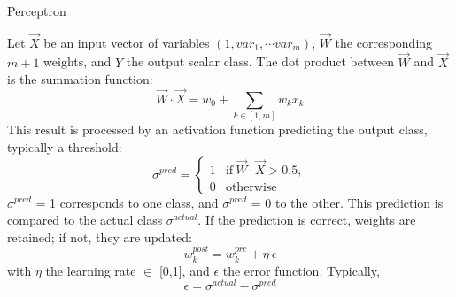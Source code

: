 \begin{algorithm}
      \caption{Perceptron}\label{alg:perceptron}
      Let \( \overrightarrow{X} \) be an input vector of variables \( (1, var_1, \cdots var_m) \), \( \overrightarrow{W} \) the corresponding \(m+1\) weights, and \( Y \) the output scalar class. The dot product between \( \overrightarrow{W} \) and \( \overrightarrow{X} \) is the summation function: 
      \begin{equation}
            \overrightarrow{W} \cdot \overrightarrow{X} = w_0 + \sum_{k \in [1,m]} w_k x_k
      \end{equation}
      This result is processed by an activation function predicting the output class, typically a threshold: 
      \begin{equation}
            \sigma^{pred} = 
            \begin{cases}
            1 & \text{if} \ \overrightarrow{W} \cdot \overrightarrow{X} > 0.5,\\
            0 & \text{otherwise}
            \end{cases}
      \end{equation}
      $\sigma^{pred}$ = 1 corresponds to one class, and $\sigma^{pred}$ = 0 to the other. This prediction is compared to the actual class $\sigma^{actual}$. If the prediction is correct, weights are retained; if not, they are updated: 
      \begin{equation}
            w_k^{post} = w_k^{pre} + \eta \ \epsilon
      \end{equation}
      with $\eta$ the learning rate $\in$ [0,1], and $\epsilon$ the error function. Typically, 
      \begin{equation}
            \epsilon = \sigma^{actual} - \sigma^{pred}
      \end{equation} 
\end{algorithm}



